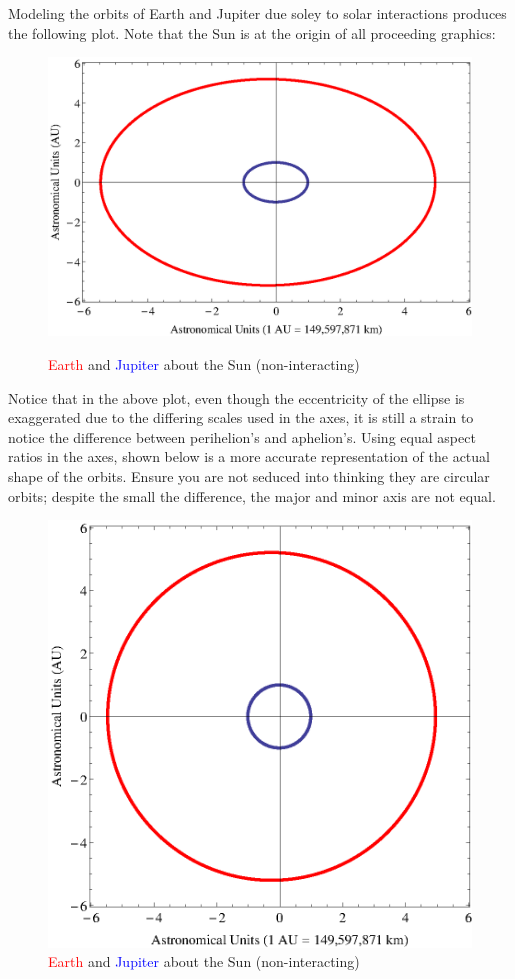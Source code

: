 \documentclass{report}
\begin{document}
\begin{enumerate}
\\
\\Modeling the orbits of Earth and Jupiter due soley to solar interactions produces the following plot. Note that the Sun is at the origin of all proceeding graphics:
\begin{figure}[H]
\centering \caption{\textcolor{red}{Earth} and \textcolor{blue}{Jupiter} about the Sun (non-interacting)}
\includegraphics[scale=.92]{sej.eps}
\label{sej}
\end{figure}
Notice that in the above plot, even though the eccentricity of the ellipse is exaggerated due to the differing scales used in the axes, it is still a strain to notice the difference between perihelion's and aphelion's. Using equal aspect ratios in the axes, shown below is a more accurate representation of the actual shape of the orbits. Ensure you are not seduced into thinking they are circular orbits; despite the small the difference, the major and minor axis are not equal.
\begin{figure}[H]
\centering \caption{\textcolor{red}{Earth} and \textcolor{blue}{Jupiter} about the Sun (non-interacting)}
\includegraphics[scale=.63]{sejCircle.eps}

\end{figure}
\end{enumerate}
\end{document}
